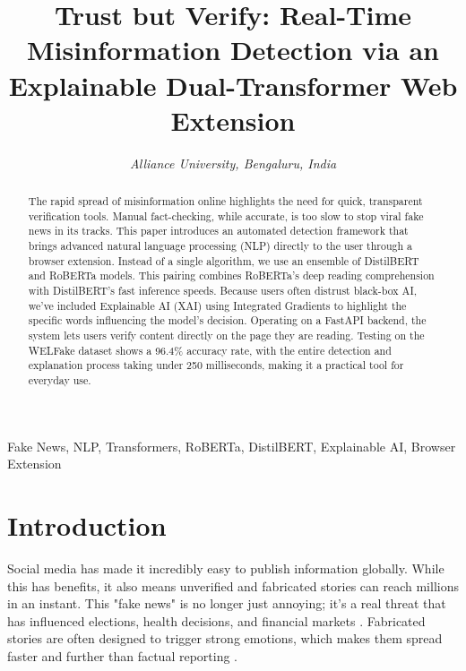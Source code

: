 \documentclass[conference]{IEEEtran}
\begin{document}
\title{Trust but Verify: Real-Time Misinformation Detection via an Explainable Dual-Transformer Web Extension}

\author{
\textit{Alliance University, Bengaluru, India }
}



\maketitle

\begin{abstract}
The rapid spread of misinformation online highlights the need for quick, transparent verification tools. Manual fact-checking, while accurate, is too slow to stop viral fake news in its tracks. This paper introduces an automated detection framework that brings advanced natural language processing (NLP) directly to the user through a browser extension. Instead of a single algorithm, we use an ensemble of DistilBERT and RoBERTa models. This pairing combines RoBERTa's deep reading comprehension with DistilBERT's fast inference speeds. Because users often distrust black-box AI, we've included Explainable AI (XAI) using Integrated Gradients to highlight the specific words influencing the model's decision. Operating on a FastAPI backend, the system lets users verify content directly on the page they are reading. Testing on the WELFake dataset shows a 96.4\% accuracy rate, with the entire detection and explanation process taking under 250 milliseconds, making it a practical tool for everyday use.
\end{abstract}

\begin{IEEEkeywords}
Fake News, NLP, Transformers, RoBERTa, DistilBERT, Explainable AI, Browser Extension
\end{IEEEkeywords}

\section{Introduction}
Social media has made it incredibly easy to publish information globally. While this has benefits, it also means unverified and fabricated stories can reach millions in an instant. This "fake news" is no longer just annoying; it's a real threat that has influenced elections, health decisions, and financial markets \cite{b4}. Fabricated stories are often designed to trigger strong emotions, which makes them spread faster and further than factual reporting \cite{b9}.
\end{document}
